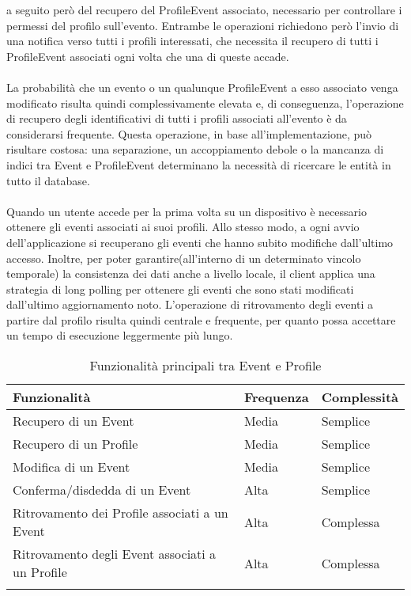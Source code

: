 a seguito però del recupero del ProfileEvent associato, 
necessario per controllare i permessi del profilo sull'evento.
Entrambe le operazioni richiedono però l'invio di una notifica verso tutti i profili interessati,
che necessita il recupero di tutti i ProfileEvent associati ogni volta che una di queste accade.\\
\\
La probabilità che un evento o un qualunque ProfileEvent a esso associato 
venga modificato risulta quindi complessivamente elevata e, di conseguenza,
l'operazione di recupero degli identificativi di tutti i profili associati all'evento
è da considerarsi frequente.
Questa operazione, in base all'implementazione, può risultare costosa:
una separazione, un accoppiamento debole o la mancanza di indici tra Event e ProfileEvent
determinano la necessità di ricercare le entità in tutto il database.\\
\\
Quando un utente accede per la prima volta su un dispositivo 
è necessario ottenere gli eventi associati ai suoi profili.
Allo stesso modo, a ogni avvio dell'applicazione si recuperano gli eventi
che hanno subito modifiche dall'ultimo accesso.
Inoltre, per poter garantire(all'interno di un determinato vincolo temporale) 
la consistenza dei dati anche a livello locale, 
il client applica una strategia di long polling 
per ottenere gli eventi che sono stati modificati dall'ultimo aggiornamento noto.
L'operazione di ritrovamento degli eventi a partire dal profilo risulta quindi centrale e frequente,
per quanto possa accettare un tempo di esecuzione leggermente più lungo. \\

\begin{longtable}{|P{9.5cm}|P{2.5cm}|P{2.5cm}|}
    \hline
    \textbf{Funzionalità} & \textbf{Frequenza }                                                 & \textbf{Complessità}\\
    \hline
    Recupero di un Event                & Media                            & Semplice                     \\
    \hline
    Recupero di un Profile         & Media                     & Semplice                     \\
    \hline
    Modifica di un Event      & Media                          & Semplice                      \\
    \hline
    Conferma/disdedda di un Event       & Alta                           & Semplice                    \\
    \hline
    Ritrovamento dei Profile associati a un Event        & Alta                           & Complessa      \\
    \hline
    Ritrovamento degli Event associati a un Profile      & Alta                          & Complessa            \\
    \hline
    \caption{Funzionalità principali tra Event e Profile}
\end{longtable}

